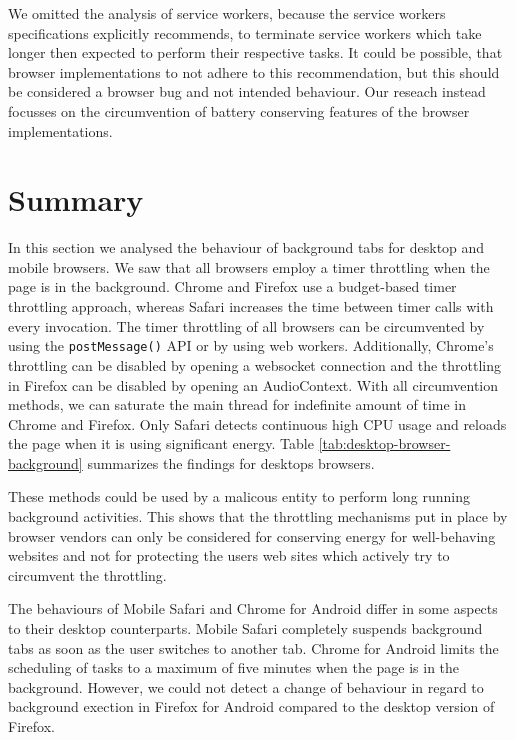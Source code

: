 \documentclass[
	ruledheaders=section,%
	class=report,%
	thesis={type=bachelor},%
	accentcolor=9c,%
	custommargins=true,%
	marginpar=false,%
	parskip=half-,%
	fontsize=11pt,%
]{tudapub}
\begin{document}
  We omitted the analysis of service workers, because the service workers specifications explicitly recommends, to terminate service workers which take longer then expected to perform their respective tasks. It could be possible, that browser implementations to not adhere to this recommendation, but this should be considered a browser bug and not intended behaviour. Our reseach instead focusses on the circumvention of battery conserving features of the browser implementations.


  
  \section{Summary}

  In this section we analysed the behaviour of background tabs for desktop and mobile browsers. We saw that all browsers employ a timer throttling when the page is in the background. Chrome and Firefox use a budget-based timer throttling approach, whereas Safari increases the time between timer calls with every invocation. The timer throttling of all browsers can be circumvented by using the \texttt{postMessage()} API or by using web workers. Additionally, Chrome's throttling can be disabled by opening a websocket connection and the throttling in Firefox can be disabled by opening an AudioContext. With all circumvention methods, we can saturate the main thread for indefinite amount of time in Chrome and Firefox. Only Safari detects continuous high CPU usage and reloads the page when it is using significant energy. Table \ref{tab:desktop-browser-background} summarizes the findings for desktops browsers.

  These methods could be used by a malicous entity to perform long running background activities. This shows that the throttling mechanisms put in place by browser vendors can only be considered for conserving energy for well-behaving websites and not for protecting the users web sites which actively try to circumvent the throttling.

  The behaviours of Mobile Safari and Chrome for Android differ in some aspects to their desktop counterparts. Mobile Safari completely suspends background tabs as soon as the user switches to another tab. Chrome for Android limits the scheduling of tasks to a maximum of five minutes when the page is in the background. However, we could not detect a change of behaviour in regard to background exection in Firefox for Android compared to the desktop version of Firefox.
\end{document}
